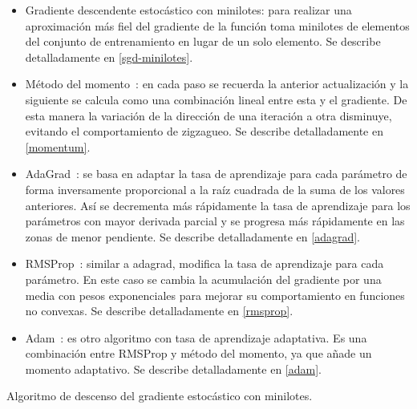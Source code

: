 \begin{itemize}
\item Gradiente descendente estocástico con minilotes: para realizar una aproximación más fiel del gradiente de la función toma minilotes de elementos del conjunto de entrenamiento en lugar de un solo elemento. Se describe detalladamente en \ref{sgd-minilotes}.
\item Método del momento~\cite{sutskever2013training}: en cada paso se recuerda la anterior actualización y la siguiente se calcula como una combinación lineal entre esta y el gradiente. De esta manera la variación de la dirección de una iteración a otra disminuye, evitando el comportamiento de zigzagueo. Se describe detalladamente en \ref{momentum}.
\item AdaGrad~\cite{duchi2011adaptive}: se basa en adaptar la tasa de aprendizaje para cada parámetro de forma inversamente proporcional a la raíz cuadrada de la suma de los valores anteriores. Así se decrementa más rápidamente la tasa de aprendizaje para los parámetros con mayor derivada parcial y se progresa más rápidamente en las zonas de menor pendiente. Se describe detalladamente en \ref{adagrad}.
\item RMSProp~\cite{tieleman2012lecture}: similar a adagrad, modifica la tasa de aprendizaje para cada parámetro. En este caso se cambia la acumulación del gradiente por una media con pesos exponenciales para mejorar su comportamiento en funciones no convexas. Se describe detalladamente en \ref{rmsprop}.
\item Adam~\cite{kingma2014adam}: es otro algoritmo con tasa de aprendizaje adaptativa. Es una combinación entre RMSProp y método del momento, ya que añade un momento adaptativo. Se describe detalladamente en \ref{adam}.
\end{itemize}

\begin{algorithm}
\label{sgd-minilotes}
 \caption{Algoritmo de descenso del gradiente estocástico con minilotes.}
     \SetAlgoLined
\end{algorithm}

